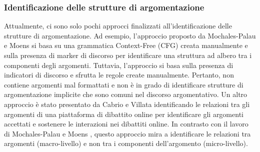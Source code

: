 \subsubsection{Identificazione delle strutture di argomentazione}
Attualmente, ci sono solo pochi approcci finalizzati all'identificazione delle strutture di argomentazione. Ad esempio, l'approccio proposto da Mochales-Palau e Moens \cite{palau2009argumentation} si basa su una grammatica Context-Free (CFG) creata manualmente e sulla presenza di marker di discorso per identificare una struttura ad albero tra i componenti degli argomenti. Tuttavia, l'approccio si basa sulla presenza di indicatori di discorso e sfrutta le regole create manualmente. Pertanto, non contiene argomenti mal formattati e non è in grado di identificare strutture di argomentazione implicite che sono comuni nel discorso argomentativo. Un altro approccio è stato presentato da Cabrio e Villata \cite{cabrio2012combining} identificando le relazioni tra gli argomenti di una piattaforma di dibattito online per identificare gli argomenti accettati e sostenere le interazioni nei dibattiti online. In contrasto con il lavoro di Mochales-Palau e Moens \cite{palau2009argumentation}, questo approccio mira a identificare le relazioni tra argomenti (macro-livello) e non tra i componenti dell'argomento (micro-livello).
